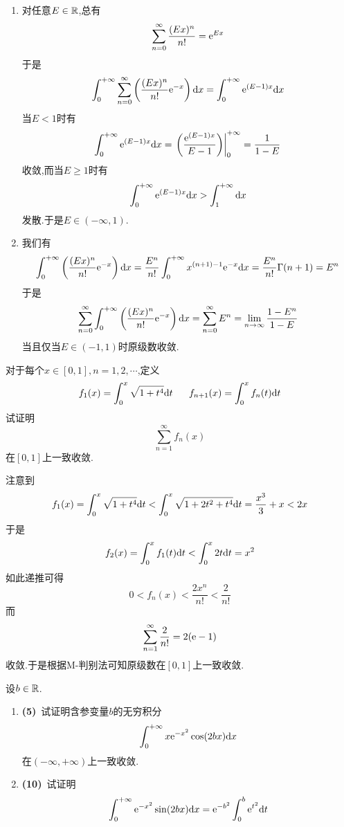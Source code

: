 \documentclass{ctexart}
\begin{document}
\begin{solution}
    \begin{enumerate}[label=\tbf{(\arabic*)},topsep=0pt,parsep=0pt,itemsep=0pt,partopsep=0pt]
        \item 对任意$E\in\mathbb{R}$,总有
            \[\sum_{n=0}^{\infty}\dfrac{(Ex)^n}{n!}=\mathrm{e}^{Ex}\]
            于是
            \[\int_0^{+\infty}\sum_{n=0}^{\infty}\left(\dfrac{(Ex)^n}{n!}\mathrm{e}^{-x}\right)\mathrm{d} x
            =\int_0^{+\infty}\mathrm{e}^{(E-1)x}\mathrm{d} x\]
            当$E<1$时有
            \[\int_0^{+\infty}\mathrm{e}^{(E-1)x}\mathrm{d} x=\left.\left(\dfrac{\mathrm{e}^{(E-1)x}}{E-1}\right)\right|_0^{+\infty}=\dfrac{1}{1-E}\]
            收敛,而当$E\geqslant 1$时有
            \[\int_0^{+\infty}\mathrm{e}^{(E-1)x}\mathrm{d} x>\int_1^{+\infty}\mathrm{d} x\]
            发散.于是$E\in(-\infty,1)$.
        \item 我们有
            \[\int_0^{+\infty}\left(\dfrac{(Ex)^n}{n!}\mathrm{e}^{-x}\right)\mathrm{d} x
            =\dfrac{E^n}{n!}\int_0^{+\infty}x^{(n+1)-1}\mathrm{e}^{-x}\mathrm{d} x
            =\dfrac{E^n}{n!}\Gamma(n+1)=E^n\]
            于是
            \[\sum_{n=0}^{\infty}\int_0^{+\infty}\left(\dfrac{(Ex)^n}{n!}\mathrm{e}^{-x}\right)\mathrm{d} x
            =\sum_{n=0}^{\infty}E^n=\lim_{n\to\infty}\dfrac{1-E^n}{1-E}\]
            当且仅当$E\in(-1,1)$时原级数收敛.
    \end{enumerate}
\end{solution}
\begin{problem}[6.(10\songti{分})]
    对于每个$x\in[0,1],n=1,2,\cdots$,定义
    \[f_1(x)=\int_0^x\sqrt{1+t^4}\di t\ \ \ \ \ f_{n+1}(x)=\int_0^xf_n(t)\di t\]
    试证明
    \[\sum_{n=1}^{\infty}f_n(x)\]
    在$[0,1]$上一致收敛.
\end{problem}
\begin{solution}
    注意到
    \[f_1(x)=\int_0^x\sqrt{1+t^4}\mathrm{d} t<\int_0^x\sqrt{1+2t^2+t^4}\mathrm{d} t=\dfrac{x^3}{3}+x<2x\]
    于是
    \[f_2(x)=\int_0^xf_1(t)\mathrm{d} t<\int_0^x2t\mathrm{d} t=x^2\]
    如此递推可得
    \[0<f_n(x)<\dfrac{2x^n}{n!}<\dfrac{2}{n!}\]
    而
    \[\sum_{n=1}^{\infty}\dfrac{2}{n!}=2(\mathrm{e}-1)\]
    收敛.于是根据M-判别法可知原级数在$[0,1]$上一致收敛.
\end{solution}
\begin{problem}[7.(15\songti{分})]
    设$b\in\mathbb{R}$.
    \begin{enumerate}[label=\tbf{(\arabic*)},topsep=0pt,parsep=0pt,itemsep=0pt,partopsep=0pt]
        \item \textbf{(5)}\ 试证明含参变量$b$的无穷积分
            \[\int_0^{+\infty}x\mathrm{e}^{-x^2}\cos(2bx)\mathrm{d} x\]
            在$(-\infty,+\infty)$上一致收敛.
        \item \textbf{(10)}\ 试证明
            \[\int_0^{+\infty}\mathrm{e}^{-x^2}\sin(2bx)\mathrm{d} x=\mathrm{e}^{-b^2}\int_0^b\mathrm{e}^{t^2}\mathrm{d} t\]
    \end{enumerate}

\end{problem}
\end{document}
